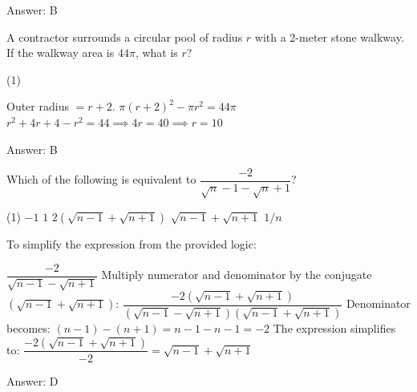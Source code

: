 \documentclass[11pt,paper=a4,answers]{exam}
\begin{document}
\begin{questions}
\begin{solution}
Answer: \colorbox{yellow!100}{B}
\end{solution}

\vspace{1cm}

\question
A contractor surrounds a circular pool of radius $r$ with a 2-meter stone walkway. If the walkway area is $44\pi$, what is $r$?

\begin{tasks}(1)
    
\end{tasks}

\begin{solution}
\begin{center}
Outer radius $= r + 2$.
\vspace{5pt}
$\pi(r+2)^2 - \pi r^2 = 44\pi$
\vspace{5pt}
$r^2 + 4r + 4 - r^2 = 44 \implies 4r = 40 \implies r = 10$
\end{center}

Answer: \colorbox{yellow!100}{B}
\end{solution}

\vspace{1cm}

\question
Which of the following is equivalent to $\dfrac{-2}{\sqrt{n} - 1 - \sqrt{n} + 1}$? 

\begin{tasks}(1)
\task[A)] $-1$ \task[B)] $1$ \task[C)] $2(\sqrt{n-1} + \sqrt{n+1})$ \task[D)] $\sqrt{n-1} + \sqrt{n+1}$ \task[E)] $1/n$
\end{tasks}

\begin{solution}
To simplify the expression from the provided logic:
\vspace{5pt}
\begin{center}
$\dfrac{-2}{\sqrt{n-1} - \sqrt{n+1}}$
\vspace{5pt}
Multiply numerator and denominator by the conjugate $(\sqrt{n-1} + \sqrt{n+1})$:
\vspace{10pt}
$\dfrac{-2(\sqrt{n-1} + \sqrt{n+1})}{(\sqrt{n-1} - \sqrt{n+1})(\sqrt{n-1} + \sqrt{n+1})}$
\vspace{5pt}
Denominator becomes: $(n-1) - (n+1) = n - 1 - n - 1 = -2$
\vspace{10pt}
The expression simplifies to: $\dfrac{-2(\sqrt{n-1} + \sqrt{n+1})}{-2} = \sqrt{n-1} + \sqrt{n+1}$
\end{center}

Answer: \colorbox{yellow!100}{D}
\end{solution}


\end{questions}
\end{document}
